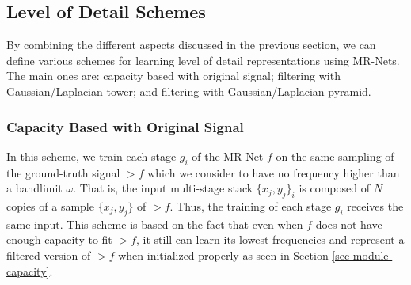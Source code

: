 

%



\pagebreak

\subsection{Level of Detail Schemes}
\label{s:lod}

By combining the different aspects discussed in the previous section, we can define various schemes for learning level of detail representations using MR-Nets. The main ones are: capacity based with original signal; filtering with Gaussian/Laplacian tower; and filtering with Gaussian/Laplacian pyramid.

\subsubsection{Capacity Based with Original Signal}
In this scheme, we train each stage $g_i$ of the MR-Net $f$ on the same sampling of the ground-truth signal $\gt{f}$ which we consider to have
no frequency higher than a bandlimit $\omega$.  That is, the input multi-stage stack $\{x_j, y_j\}_i$ is composed of $N$ copies of a sample $\{x_j, y_j\}$ of $\gt{f}$. Thus, the training of each stage $g_i$ receives the same input. This scheme is based on the fact that even when $f$ does not have enough capacity to fit $\gt{f}$, it still can learn its lowest frequencies and represent a filtered version of $\gt{f}$ when initialized properly as seen in Section \ref{sec-module-capacity}. 

